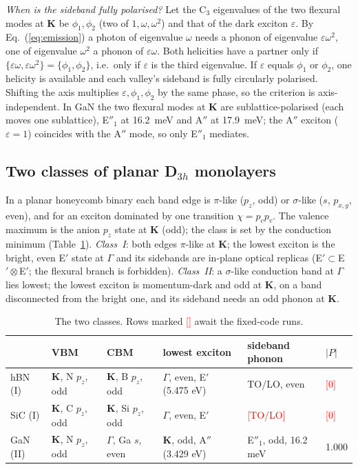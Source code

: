 \documentclass[10pt,a4paper]{article}
\newcommand{\tbd}[1]{\textcolor{red}{[#1]}}
\newcommand{\bK}{\mathbf{K}}
\begin{document}
\emph{When is the sideband fully polarised?} Let the C$_3$ eigenvalues of the
two flexural modes at $\bK$ be $\phi_1,\phi_2$ (two of $1,\omega,\omega^2$) and
that of the dark exciton $\varepsilon$. By Eq.~(\ref{eq:emission}) a photon of
eigenvalue $\omega$ needs a phonon of eigenvalue $\varepsilon\omega^2$, one of
eigenvalue $\omega^2$ a phonon of $\varepsilon\omega$. Both helicities have a
partner only if $\{\varepsilon\omega,\varepsilon\omega^2\}=\{\phi_1,\phi_2\}$,
i.e.\ only if $\varepsilon$ is the third eigenvalue. If $\varepsilon$ equals
$\phi_1$ or $\phi_2$, one helicity is available and each valley's sideband is
fully circularly polarised. Shifting the axis multiplies $\varepsilon,\phi_1,
\phi_2$ by the same phase, so the criterion is axis-independent. In GaN the two
flexural modes at $\bK$ are sublattice-polarised (each moves one sublattice),
E$''_1$ at 16.2~meV and A$''$ at 17.9~meV; the A$''$ exciton ($\varepsilon=1$)
coincides with the A$''$ mode, so only E$''_1$ mediates.

\subsection{Two classes of planar D$_{3h}$ monolayers}
In a planar honeycomb binary each band edge is $\pi$-like ($p_z$, odd) or
$\sigma$-like ($s$, $p_{x,y}$, even), and for an exciton dominated by one
transition $\chi=p_cp_v$. The valence maximum is the anion $p_z$ state at $\bK$
(odd); the class is set by the conduction minimum (Table~\ref{tab:classes}).
\emph{Class~I}: both edges $\pi$-like at $\bK$; the lowest exciton is the bright,
even E$'$ state at $\Gamma$ and its sidebands are in-plane optical replicas
(E$'\subset$E$'\otimes$E$'$; the flexural branch is forbidden). \emph{Class~II}:
a $\sigma$-like conduction band at $\Gamma$ lies lowest; the lowest exciton is
momentum-dark and odd at $\bK$, on a band disconnected from the bright one, and
its sideband needs an odd phonon at $\bK$.

\begin{table}[h]
\centering\small
\caption{The two classes. Rows marked \tbd{} await the fixed-code runs.}
\label{tab:classes}
\begin{tabular}{llllll}
\toprule
 & VBM & CBM & lowest exciton & sideband phonon & $|P|$\\
\midrule
hBN (I) & $\bK$, N $p_z$, odd & $\bK$, B $p_z$, odd & $\Gamma$, even, E$'$ (5.475 eV) & TO/LO, even & \tbd{0}\\
SiC (I) & $\bK$, C $p_z$, odd & $\bK$, Si $p_z$, odd & $\Gamma$, even, E$'$ & \tbd{TO/LO} & \tbd{0}\\
GaN (II) & $\bK$, N $p_z$, odd & $\Gamma$, Ga $s$, even & $\bK$, odd, A$''$ (3.429 eV) & E$''_1$, odd, 16.2 meV & 1.000\\
\bottomrule
\end{tabular}
\end{table}
\end{document}
